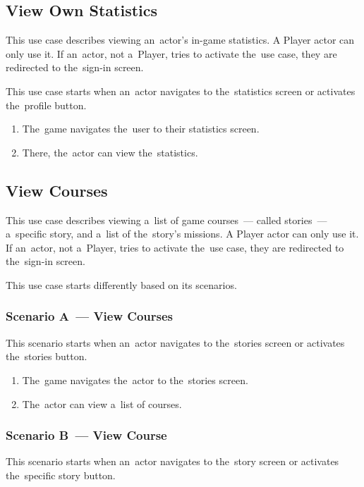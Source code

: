 \subsection{View Own Statistics}

This use case describes viewing an~actor's in-game statistics.
A Player actor can only use it.
If an~actor, not a~Player, tries to activate the~use case, they are redirected to the~sign-in screen.

This use case starts when an~actor navigates to the~statistics screen or activates the~profile button.

\begin{enumerate}
    \item The~game navigates the~user to their statistics screen.
    \item There, the~actor can view the~statistics.
\end{enumerate}

\pagebreak
\subsection{View Courses}

This use case describes viewing a~list of game courses~--- called stories~--- a~specific story, and a~list of the~story's missions.
A Player actor can only use it.
If an~actor, not a~Player, tries to activate the~use case, they are redirected to the~sign-in screen.

This use case starts differently based on its scenarios.

\subsubsection*{Scenario A~--- View Courses}

This scenario starts when an~actor navigates to the~stories screen or activates the~stories button.

\begin{enumerate}
    \item The~game navigates the~actor to the~stories screen.
    \item The~actor can view a~list of courses.
\end{enumerate}

\subsubsection*{Scenario B~--- View Course}

This scenario starts when an~actor navigates to the~story screen or activates the~specific story button.

